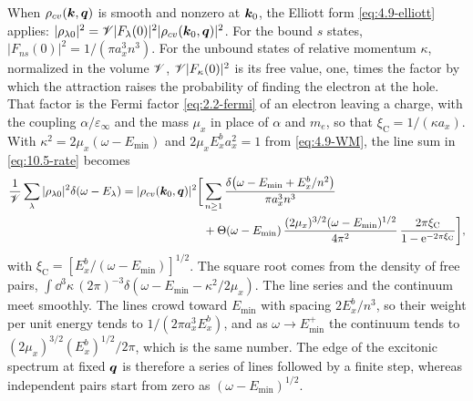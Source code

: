 When $\rho_{cv}(\bm{k},\bm{q})$ is smooth and nonzero at $\bm{k}_0$, the Elliott form \cref{eq:4.9-elliott} applies: $|\rho_{\lambda0}|^2 = \mathscr{V}|F_\lambda(0)|^2|\rho_{cv}(\bm{k}_0,\bm{q})|^2$. For the bound $s$ states, $|F_{ns}(0)|^2 = 1/(\pi a_x^3n^3)$. For the unbound states of relative momentum $\kappa$, normalized in the volume $\mathscr{V}$, $\mathscr{V}|F_{\kappa}(0)|^2$ is its free value, one, times the factor by which the attraction raises the probability of finding the electron at the hole. That factor is the Fermi factor \cref{eq:2.2-fermi} of an electron leaving a charge, with the coupling $\alpha/\varepsilon_\infty$ and the mass $\mu_x$ in place of $\alpha$ and $m_e$, so that $\xi_{\mathrm{C}} = 1/(\kappa a_x)$. With $\kappa^2 = 2\mu_x(\omega - E_{\mathrm{min}})$ and $2\mu_xE_x^ba_x^2 = 1$ from \cref{eq:4.9-WM}, the line sum in \cref{eq:10.5-rate} becomes
\begin{equation}
  \begin{aligned}
  \frac1{\mathscr{V}}\sum_\lambda|\rho_{\lambda0}|^2\delta(\omega - E_\lambda) = |\rho_{cv}(\bm{k}_0,\bm{q})|^2\biggl[&\sum_{n\ge1}\frac{\delta\bigl(\omega - E_{\mathrm{min}} + E_x^b/n^2\bigr)}{\pi a_x^3n^3} \\
  &+ \Theta(\omega - E_{\mathrm{min}})\,\frac{(2\mu_x)^{3/2}(\omega - E_{\mathrm{min}})^{1/2}}{4\pi^2}\,\frac{2\pi\xi_{\mathrm{C}}}{1 - \mathrm{e}^{-2\pi\xi_{\mathrm{C}}}}\biggr] ,
  \end{aligned}
  \label{eq:10.5-lines}
\end{equation}
with $\xi_{\mathrm{C}} = [E_x^b/(\omega - E_{\mathrm{min}})]^{1/2}$. The square root comes from the density of free pairs, $\int\dd^3\kappa\,(2\pi)^{-3}\delta(\omega - E_{\mathrm{min}} - \kappa^2/2\mu_x)$. The line series and the continuum meet smoothly. The lines crowd toward $E_{\mathrm{min}}$ with spacing $2E_x^b/n^3$, so their weight per unit energy tends to $1/(2\pi a_x^3E_x^b)$, and as $\omega \to E_{\mathrm{min}}^+$ the continuum tends to $(2\mu_x)^{3/2}(E_x^b)^{1/2}/2\pi$, which is the same number. The edge of the excitonic spectrum at fixed $\bm{q}$ is therefore a series of lines followed by a finite step, whereas independent pairs start from zero as $(\omega - E_{\mathrm{min}})^{1/2}$.

